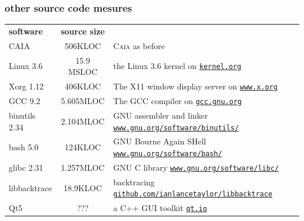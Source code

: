 \documentclass[xcolor=svgnames,final,smaller,a4]{beamer}
\begin{document}
 \begin{frame}
   \frametitle{other source code mesures}

 \begin{tabular}{lcp{}}
   \textbf{software} & \textbf{source size} & \\
   CAIA & 506KLOC & \textsc{Caia} as before \\
   Linux 3.6 & 15.9 MSLOC & the Linux 3.6 kernel on \href{https://kernel.org/}{\texttt{kernel.org}} \\
   Xorg 1.12 & 406KLOC & The X11 window display server on \href{https://www.x.org/}{\texttt{www.x.org}}  \\
   GCC 9.2 & 5.605MLOC & The GCC compiler on \href{https://gcc.gnu.org/}{\texttt{gcc.gnu.org}} \\
   binutils 2.34 & 2.104MLOC & GNU assembler and linker \href{https://www.gnu.org/software/binutils/}{\texttt{www.gnu.org/software/binutils/}} \\
   bash 5.0 & 124KLOC & GNU Bourne Again SHell \href{https://www.gnu.org/software/bash/}{\texttt{www.gnu.org/software/bash/}} \\
   glibc 2.31 & 1.257MLOC & GNU C library \href{https://www.gnu.org/software/libc/}{\texttt{www.gnu.org/software/libc/}} \\
   libbacktrace & 18.9KLOC & backtracing \href{https://github.com/ianlancetaylor/libbacktrace}{\texttt{github.com/ianlancetaylor/libbacktrace}} \\
   Qt5 & ??? & a C++ GUI toolkit \href{https://qt.io/}{\texttt{qt.io}}\\
 \end{tabular}
 
 \end{frame}
  
\end{document}
